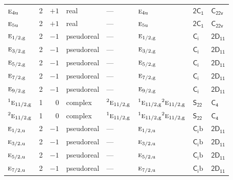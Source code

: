 \documentclass[10pt,a4paper]{article}
\makeatletter
\def\grouprule#1#2{\noalign{\marks\LTgroupmarks{\the\belowrulesep}\nobreak\vskip#1%
  \vskip\aboverulesep}\multispan\LT@cols\unskip{\leaders\hrule\@height#2\hfill\kern\z@}\cr
  \noalign{\penalty\LTrulebreak\vskip\belowrulesep\global\@lastruleclass\z@}}
\numberwithin{equation}{section}
\newcommand{\grp}[1]{\mathsf{#1}}
\newcommand{\irr}[1]{\text{\normalfont\scshape #1}}
\newcommand{\conjpair}[1]{{}^{#1}}
\newcommand{\ptag}[1]{\mathrm{#1}}
\newcommand{\secondclass}{\mathrm{b}}
\makeatother
\begin{document}
{\begin{longtable}{@{}lrrlllll@{}}
$\irr{e}_{4\ptag{u}}$ & 2 & $+1$ & real & --- & $\irr{e}_{4\ptag{u}}$ & \href{2C1.pdf}{$\grp{2C_{1}}$} & $\grp{C_{22v}}$\\
$\irr{e}_{5\ptag{u}}$ & 2 & $+1$ & real & --- & $\irr{e}_{5\ptag{u}}$ & \href{2C1.pdf}{$\grp{2C_{1}}$} & $\grp{C_{22v}}$\\
\grouprule{0pt}{\lightrulewidth}
$\irr{e}_{1/2,\ptag{g}}$ & 2 & $-1$ & pseudoreal & --- & $\irr{e}_{1/2,\ptag{g}}$ & \href{S2.pdf}{$\grp{C_{i}}$} & \href{2D11.pdf}{$\grp{2D_{11}}$}\\
$\irr{e}_{3/2,\ptag{g}}$ & 2 & $-1$ & pseudoreal & --- & $\irr{e}_{3/2,\ptag{g}}$ & \href{S2.pdf}{$\grp{C_{i}}$} & \href{2D11.pdf}{$\grp{2D_{11}}$}\\
$\irr{e}_{5/2,\ptag{g}}$ & 2 & $-1$ & pseudoreal & --- & $\irr{e}_{5/2,\ptag{g}}$ & \href{S2.pdf}{$\grp{C_{i}}$} & \href{2D11.pdf}{$\grp{2D_{11}}$}\\
$\irr{e}_{7/2,\ptag{g}}$ & 2 & $-1$ & pseudoreal & --- & $\irr{e}_{7/2,\ptag{g}}$ & \href{S2.pdf}{$\grp{C_{i}}$} & \href{2D11.pdf}{$\grp{2D_{11}}$}\\
$\irr{e}_{9/2,\ptag{g}}$ & 2 & $-1$ & pseudoreal & --- & $\irr{e}_{9/2,\ptag{g}}$ & \href{S2.pdf}{$\grp{C_{i}}$} & \href{2D11.pdf}{$\grp{2D_{11}}$}\\
$\conjpair{1}\irr{e}_{11/2,\ptag{g}}$ & 1 & $0$ & complex & $\conjpair{2}\irr{e}_{11/2,\ptag{g}}$ & $\conjpair{1}\irr{e}_{11/2,\ptag{g}}\conjpair{2}\irr{e}_{11/2,\ptag{g}}$ & \href{S22.pdf}{$\grp{S_{22}}$} & \href{../../../rotation/data/pdf/C4.pdf}{$\grp{C_{4}}$}\\
$\conjpair{2}\irr{e}_{11/2,\ptag{g}}$ & 1 & $0$ & complex & $\conjpair{1}\irr{e}_{11/2,\ptag{g}}$ & $\conjpair{1}\irr{e}_{11/2,\ptag{g}}\conjpair{2}\irr{e}_{11/2,\ptag{g}}$ & \href{S22.pdf}{$\grp{S_{22}}$} & \href{../../../rotation/data/pdf/C4.pdf}{$\grp{C_{4}}$}\\
$\irr{e}_{1/2,\ptag{u}}$ & 2 & $-1$ & pseudoreal & --- & $\irr{e}_{1/2,\ptag{u}}$ & \href{S2b.pdf}{$\grp{C_{i}}\secondclass$} & \href{2D11.pdf}{$\grp{2D_{11}}$}\\
$\irr{e}_{3/2,\ptag{u}}$ & 2 & $-1$ & pseudoreal & --- & $\irr{e}_{3/2,\ptag{u}}$ & \href{S2b.pdf}{$\grp{C_{i}}\secondclass$} & \href{2D11.pdf}{$\grp{2D_{11}}$}\\
$\irr{e}_{5/2,\ptag{u}}$ & 2 & $-1$ & pseudoreal & --- & $\irr{e}_{5/2,\ptag{u}}$ & \href{S2b.pdf}{$\grp{C_{i}}\secondclass$} & \href{2D11.pdf}{$\grp{2D_{11}}$}\\
$\irr{e}_{7/2,\ptag{u}}$ & 2 & $-1$ & pseudoreal & --- & $\irr{e}_{7/2,\ptag{u}}$ & \href{S2b.pdf}{$\grp{C_{i}}\secondclass$} & \href{2D11.pdf}{$\grp{2D_{11}}$}\\

\end{longtable}}
\end{document}

